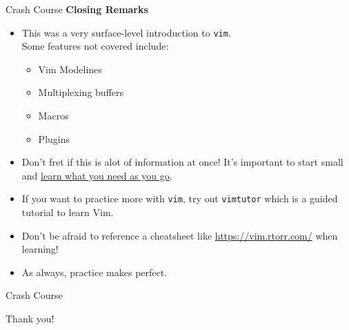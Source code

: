 \documentclass{beamer}
\begin{document}
\begin{frame}{Crash Course}
	\textbf{Closing Remarks}
	\begin{itemize}
		\item This was a very surface-level introduction to
			\texttt{vim}.\\
			Some features not covered include:
			\begin{itemize}
				\item Vim Modelines
				\item Multiplexing buffers
				\item Macros
				\item Plugins
			\end{itemize}
		\item Don't fret if this is alot of information at once! It's
			important to start small and \underline{learn what you
			need as you go}.
		\item If you want to practice more with \texttt{vim}, try out
			\texttt{vimtutor} which is a guided tutorial to learn
			Vim.
		\item Don't be afraid to reference a cheatsheet like
			\url{https://vim.rtorr.com/} when learning!
		\item As always, practice makes perfect.
	\end{itemize}
\end{frame}

\begin{frame}{Crash Course}
	\begin{center}
		\Huge Thank you!
	\end{center}
\end{frame}
\end{document}
